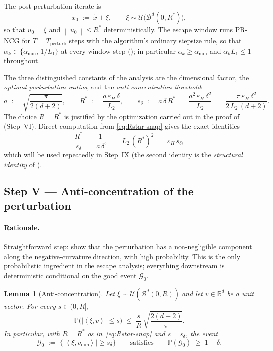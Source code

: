 \documentclass[11pt,a4paper]{article}
\theoremstyle{plain}
\newtheorem{lemma}{Lemma}
\theoremstyle{definition}
\newcommand{\R}{\mathbb{R}}
\newcommand{\norm}[1]{\left\|#1\right\|}
\newcommand{\inner}[2]{\left\langle #1,#2 \right\rangle}
\newcommand{\eps}{\varepsilon}
\newcommand{\epsH}{\eps_{H}}
\newcommand{\Lone}{L_{1}}
\newcommand{\Ltwo}{L_{2}}
\newcommand{\Tp}{T_{\mathrm{perturb}}}
\newcommand{\snap}{\tilde{x}}
\newcommand{\vmin}{v_{\min}}
\newcommand{\sdel}{s_{\delta}}
\renewcommand{\Pr}{\mathbb{P}}
\newcommand{\Rstar}{R^{*}}
\newcommand{\amin}{\alpha_{\min}}
\begin{document}
The post-perturbation iterate is
\[
x_{0} \;:=\; \snap + \xi,
\qquad
\xi \sim \mathcal{U}\!\bigl(\mathcal{B}^{d}(0,\Rstar)\bigr),
\]
so that $u_{0}=\xi$ and $\norm{u_{0}}\le \Rstar$ deterministically. The escape window runs PR-NCG for $T=\Tp$ steps with the algorithm's ordinary
stepsize rule, so that $\alpha_{k}\in\{\amin,\,1/\Lone\}$ at every window step
(); in particular $\alpha_{k}\ge\amin$ and
$\alpha_{k}\Lone\le 1$ throughout.

The three distinguished constants of the analysis are the dimensional factor, the
\emph{optimal perturbation radius}, and the \emph{anti-concentration threshold}:
\begin{equation}\label{eq:Rstar-snap}
a \;:=\; \sqrt{\frac{\pi}{2(d+2)}},
\qquad
\Rstar \;:=\; \frac{a\,\epsH\,\delta}{\Ltwo},
\qquad
\sdel \;:=\; a\,\delta\,\Rstar
\;=\; \frac{a^{2}\,\epsH\,\delta^{2}}{\Ltwo}
\;=\; \frac{\pi\,\epsH\,\delta^{2}}{2\,\Ltwo\,(d+2)}.
\end{equation}
The choice $R = \Rstar$ is justified by the optimization carried out in the
proof of  (Step~VI). Direct computation from
\eqref{eq:Rstar-snap} gives the exact identities
\begin{equation}\label{eq:identities}
\frac{\Rstar}{\sdel} \;=\; \frac{1}{a\,\delta},
\qquad
\Ltwo\,(\Rstar)^{2} \;=\; \epsH\,\sdel ,
\end{equation}
which will be used repeatedly in Step~IX (the second identity is the
\emph{structural identity} of ).

\subsection{Step V --- Anti-concentration of the perturbation}\label{sub:anticonc}

\paragraph{Rationale.}
Straightforward step: show that the perturbation has a non-negligible component
along the negative-curvature direction, with high probability. This is the only
probabilistic ingredient in the escape analysis; everything downstream is
deterministic conditional on the good event $\mathcal{G}_{0}$.

\begin{lemma}[Anti-concentration]\label{lem:anticoncentration}
Let $\xi\sim\mathcal{U}(\mathcal{B}^{d}(0,R))$ and let $v\in\R^{d}$ be a unit
vector. For every $s\in(0,R]$,
\begin{equation}\label{eq:anticonc-prob}
\Pr\bigl(|\inner{\xi}{v}|\le s\bigr)
\;\le\; \frac{s}{R}\,\sqrt{\frac{2(d+2)}{\pi}}.
\end{equation}
In particular, with $R=\Rstar$ as in~\eqref{eq:Rstar-snap} and $s=\sdel$, the event
\[
\mathcal{G}_{0} \;:=\; \bigl\{|\inner{\xi}{\vmin}|\ge\sdel\bigr\}
\qquad\text{satisfies}\qquad
\Pr(\mathcal{G}_{0}) \;\ge\; 1-\delta.
\]
\end{lemma}
\end{document}
